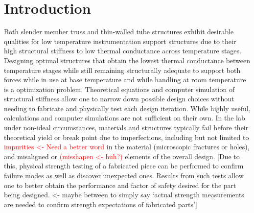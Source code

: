 \documentclass[final]{svjour2}
\begin{document}
\section{Introduction}
Both slender member truss and thin-walled tube structures exhibit desirable qualities for low temperature instrumentation support structures due to their high structural stiffness to low thermal conductance across temperature stages.  Designing optimal structures that obtain the lowest thermal conductance between temperature stages while still remaining structurally adequate to support both forces while in use at base temperature and while handling at room temperature is a optimization problem.  Theoretical equations and computer simulation of structural stiffness allow one to narrow down possible design choices without needing to fabricate and physically test each design iteration.  While highly useful, calculations and computer simulations are not sufficient on their own. In the lab under non-ideal circumstances, materials and structures typically fail before their theoretical yield or break point due to imperfections, including but not limited to \textcolor{red}{impurities <- Need a better word} in the material (microscopic fractures or holes), and misaligned or \textcolor{red}{(misshapen <- huh?)} elements of the overall design.  [Due to this, physical strength testing of a fabricated piece can be performed to confirm failure modes as well as discover unexpected ones.  Results from such tests allow one to better obtain the performance and factor of safety desired for the part being designed. <- maybe between to simply say `actual strength measurements are needed to confirm strength expectations of fabricated parts']
\end{document}
